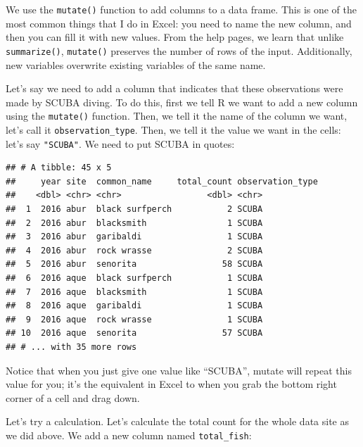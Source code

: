 \documentclass[]{book}
\newenvironment{Shaded}{\begin{snugshade}}{\end{snugshade}}
\newcommand{\DataTypeTok}[1]{\textcolor[rgb]{0.13,0.29,0.53}{#1}}
\newcommand{\KeywordTok}[1]{\textcolor[rgb]{0.13,0.29,0.53}{\textbf{#1}}}
\newcommand{\NormalTok}[1]{#1}
\newcommand{\OperatorTok}[1]{\textcolor[rgb]{0.81,0.36,0.00}{\textbf{#1}}}
\newcommand{\StringTok}[1]{\textcolor[rgb]{0.31,0.60,0.02}{#1}}
\begin{document}
We use the \texttt{mutate()} function to add columns to a data frame. This is one of the most common things that I do in Excel: you need to name the new column, and then you can fill it with new values. From the help pages, we learn that unlike \texttt{summarize()}, \texttt{mutate()} preserves the number of rows of the input. Additionally, new variables overwrite existing variables of the same name.

Let's say we need to add a column that indicates that these observations were made by SCUBA diving. To do this, first we tell R we want to add a new column using the \texttt{mutate()} function. Then, we tell it the name of the column we want, let's call it \texttt{observation\_type}. Then, we tell it the value we want in the cells: let's say \texttt{"SCUBA"}. We need to put SCUBA in quotes:

\begin{Shaded}
\end{Shaded}

\begin{verbatim}
## # A tibble: 45 x 5
##     year site  common_name     total_count observation_type
##    <dbl> <chr> <chr>                 <dbl> <chr>           
##  1  2016 abur  black surfperch           2 SCUBA           
##  2  2016 abur  blacksmith                1 SCUBA           
##  3  2016 abur  garibaldi                 1 SCUBA           
##  4  2016 abur  rock wrasse               2 SCUBA           
##  5  2016 abur  senorita                 58 SCUBA           
##  6  2016 aque  black surfperch           1 SCUBA           
##  7  2016 aque  blacksmith                1 SCUBA           
##  8  2016 aque  garibaldi                 1 SCUBA           
##  9  2016 aque  rock wrasse               1 SCUBA           
## 10  2016 aque  senorita                 57 SCUBA           
## # ... with 35 more rows
\end{verbatim}

Notice that when you just give one value like ``SCUBA'', mutate will repeat this value for you; it's the equivalent in Excel to when you grab the bottom right corner of a cell and drag down.

Let's try a calculation. Let's calculate the total count for the whole data site as we did above. We add a new column named \texttt{total\_fish}:
\end{document}
